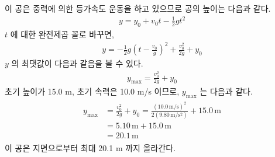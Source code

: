 \documentclass[floatfix,nofootinbib,superscriptaddress,fleqn,preprint]{revtex4}
\begin{document}
 이 공은 중력에 의한 등가속도 운동을 
하고 있으므로 공의 높이는 다음과 같다.
\begin{align}
  y=y_0+v_0t-\frac{1}{2}gt^2
\end{align}
$t$ 에 대한 완전제곱 꼴로 바꾸면,
\begin{align}
  y=-\frac{1}{2}g\left( t-\frac{v_0}{g} \right)^2+\frac{v_0^2}{2g}+y_0
\end{align}
$y$ 의 최댓값이 다음과 같음을 볼 수 있다.
\begin{align}
  y_{\mathrm{max}}=\frac{v_0^2}{2g}+y_0
\end{align}
초기 높이가 15.0 m, 초기 속력은 10.0 m/s 이므로, $y_{\mathrm{max}}$ 는 다음과 같다.
\begin{align}
  \begin{split}
    y_{\mathrm{max}}&=\frac{v_0^2}{2g}+y_0 
    = \frac{(10.0\,\mathrm{m/s})^2}{2(9.80\,\mathrm{m/s^2})}+15.0\,\mathrm{m} \\
    &=5.10\,\mathrm{m}+15.0\,\mathrm{m} \\
    &=20.1\,\mathrm{m}
  \end{split}
\end{align}
이 공은 지면으로부터 최대 20.1 m 까지 올라간다.
\end{document}
